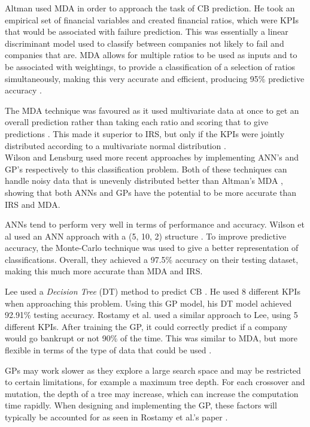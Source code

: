 \documentclass[11pt]{article}
\begin{document}
Altman used MDA in order to approach the task of CB prediction. He took an empirical set of financial variables and created financial ratios, which were KPIs that would be associated with failure prediction. This was essentially a linear discriminant model used to classify between companies not likely to fail and companies that are. MDA allows for multiple ratios to be used as inputs and to be associated with weightings, to provide a classification of a selection of ratios simultaneously, making this very accurate and efficient, producing 95\% predictive accuracy \cite{ref-six, ref-nine}. 

The MDA technique was favoured as it used multivariate data at once to get an overall prediction rather than taking each ratio and scoring that to give predictions \cite{ref-six}. This made it superior to IRS, but only if the KPIs were jointly distributed according to a multivariate normal distribution \cite{ref-nine}. \\
Wilson and Lensburg used more recent approaches by implementing ANN's and GP's respectively to this classification problem. Both of these techniques can handle noisy data that is unevenly distributed better than Altman's MDA \cite{ref-nine,ref-ten}, showing that both ANNs and GPs have the potential to be more accurate than IRS and MDA. 

ANNs tend to perform very well in terms of performance and accuracy. Wilson et al used an ANN approach with a (5, 10, 2) structure \cite{ref-nine}. To improve predictive accuracy, the Monte-Carlo technique was used to give a better representation of classifications. Overall, they achieved a 97.5\% accuracy on their testing dataset, making this much more accurate than MDA and IRS.

Lee used a \textit{Decision Tree} (DT) method to predict CB \cite{ref-eleven}. He used 8 different KPIs when approaching this problem. Using this GP model, his DT model achieved 92.91\% testing accuracy. Rostamy et al. used a similar approach to Lee, using 5 different KPIs. After training the GP, it could correctly predict if a company would go bankrupt or not 90\% of the time. This was similar to MDA, but more flexible in terms of the type of data that could be used \cite{ref-twelve}.

GPs may work slower as they explore a large search space and may be restricted to certain limitations, for example a maximum tree depth. For each crossover and mutation, the depth of a tree may increase, which can increase the computation time rapidly. When designing and implementing the GP, these factors will typically be accounted for as seen in Rostamy et al.'s paper \cite{ref-twelve}. \\
\end{document}
